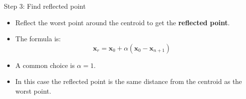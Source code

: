 \documentclass[10pt]{beamer}
\begin{document}
                                                                                              \begin{frame}{Step 3: Find reflected point}
                                                                                                \begin{itemize}
                                                                                                \item Reflect the worst point around the centroid to get the {\bf reflected point}.

                                                                                                \item The formula is:
                                                                                                  \begin{equation}
                                                                                                    {\bm x_r}={\bm x_0}+\alpha({\bm x_0}-{\bm x_{n+1}})
                                                                                                  \end{equation}

                                                                                                \item A common choice is $\alpha=1$.

                                                                                                \item In this case the reflected point is the same distance from the centroid as the worst point.
                                                                                                \end{itemize}
                                                                                              \end{frame}
\end{document}
